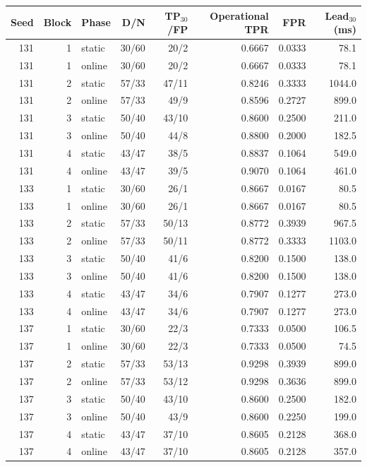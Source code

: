 \begin{tabular}{rrlrrrrr}
\toprule
Seed & Block & Phase & D/N & TP$_{30}$/FP & Operational TPR & FPR & Lead$_{30}$ (ms) \\
\midrule
131 & 1 & static & 30/60 & 20/2 & 0.6667 & 0.0333 & 78.1 \\
131 & 1 & online & 30/60 & 20/2 & 0.6667 & 0.0333 & 78.1 \\
131 & 2 & static & 57/33 & 47/11 & 0.8246 & 0.3333 & 1044.0 \\
131 & 2 & online & 57/33 & 49/9 & 0.8596 & 0.2727 & 899.0 \\
131 & 3 & static & 50/40 & 43/10 & 0.8600 & 0.2500 & 211.0 \\
131 & 3 & online & 50/40 & 44/8 & 0.8800 & 0.2000 & 182.5 \\
131 & 4 & static & 43/47 & 38/5 & 0.8837 & 0.1064 & 549.0 \\
131 & 4 & online & 43/47 & 39/5 & 0.9070 & 0.1064 & 461.0 \\
\midrule
133 & 1 & static & 30/60 & 26/1 & 0.8667 & 0.0167 & 80.5 \\
133 & 1 & online & 30/60 & 26/1 & 0.8667 & 0.0167 & 80.5 \\
133 & 2 & static & 57/33 & 50/13 & 0.8772 & 0.3939 & 967.5 \\
133 & 2 & online & 57/33 & 50/11 & 0.8772 & 0.3333 & 1103.0 \\
133 & 3 & static & 50/40 & 41/6 & 0.8200 & 0.1500 & 138.0 \\
133 & 3 & online & 50/40 & 41/6 & 0.8200 & 0.1500 & 138.0 \\
133 & 4 & static & 43/47 & 34/6 & 0.7907 & 0.1277 & 273.0 \\
133 & 4 & online & 43/47 & 34/6 & 0.7907 & 0.1277 & 273.0 \\
\midrule
137 & 1 & static & 30/60 & 22/3 & 0.7333 & 0.0500 & 106.5 \\
137 & 1 & online & 30/60 & 22/3 & 0.7333 & 0.0500 & 74.5 \\
137 & 2 & static & 57/33 & 53/13 & 0.9298 & 0.3939 & 899.0 \\
137 & 2 & online & 57/33 & 53/12 & 0.9298 & 0.3636 & 899.0 \\
137 & 3 & static & 50/40 & 43/10 & 0.8600 & 0.2500 & 182.0 \\
137 & 3 & online & 50/40 & 43/9 & 0.8600 & 0.2250 & 199.0 \\
137 & 4 & static & 43/47 & 37/10 & 0.8605 & 0.2128 & 368.0 \\
137 & 4 & online & 43/47 & 37/10 & 0.8605 & 0.2128 & 357.0 \\
\bottomrule
\end{tabular}

